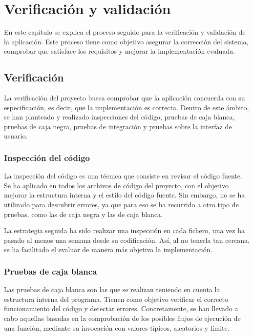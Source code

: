 \chapter{Verificación y validación\label{cap:pruebas}}

En este capítulo se explica el proceso seguido para la verificación y validación de la aplicación.
Este proceso tiene como objetivo asegurar la corrección del sistema, comprobar que satisface los requisitos y mejorar la implementación evaluada.

\section{Verificación\label{sec:pb:verificacion}}

La verificación del proyecto busca comprobar que la aplicación concuerda con su especificación, es decir, que la implementación es correcta.
Dentro de este ámbito, se han planteado y realizado inspecciones del código, pruebas de caja blanca, pruebas de caja negra, pruebas de integración y pruebas sobre la interfaz de usuario.

\subsection*{Inspección del código\label{ssec:pb:inspeccion}}

La inspección del código es una técnica que consiste en revisar el código fuente.
Se ha aplicado en todos los archivos de código del proyecto, con el objetivo mejorar la estructura interna y el estilo del código fuente.
Sin embargo, no se ha utilizado para descubrir errores, ya que para eso se ha recurrido a otro tipo de pruebas, como las de caja negra y las de caja blanca.

La estrategia seguida ha sido realizar una inspección en cada fichero, una vez ha pasado al menos una semana desde su codificación.
Así, al no tenerla tan cercana, se ha facilitado el evaluar de manera más objetiva la implementación.

\subsection*{Pruebas de caja blanca\label{ssec:pb:caja_blanca}}

Las pruebas de caja blanca son las que se realizan teniendo en cuenta la estructura interna del programa.
Tienen como objetivo verificar el correcto funcionamiento del código y detectar errores.
Concretamente, se han llevado a cabo aquellas basadas en la comprobación de los posibles flujos de ejecución de una función, mediante su invocación con valores típicos, aleatorios y límite.

